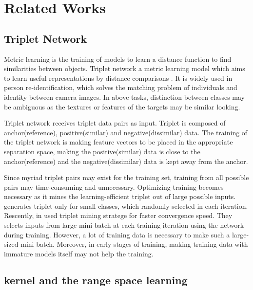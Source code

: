 \documentclass[runningheads]{llncs}
\begin{document}
\section{Related Works}

\subsection{Triplet Network}
Metric learning is the training of models to learn a distance function to find similarities between objects. 
Triplet network a metric learning model which aims to learn useful representations by distance comparisons \cite{hoffer2015deep}. It is widely used in person re-identification, which solves the matching problem of individuals and identity between camera images\cite{ding2015deep,cheng2016person,chen2017beyond,schroff2015facenet,wang2016joint}. In above tasks, distinction between classes may be ambiguous as the textures or features of the targets may be similar looking.

Triplet network receives triplet data pairs as input. Triplet is composed of anchor(reference), positive(similar) and negative(dissimilar) data.
The training of the triplet network is making feature vectors to be placed in the appropriate separation space, making the positive(similar) data is close to the anchor(reference) and the negative(dissimilar) data is kept away from the anchor.

Since myriad triplet pairs may exist for the training set, training from all possible pairs may time-consuming and unnecessary. Optimizing training becomes necessary as it mines the learning-efficient triplet out of large possible inputs.
\cite{cheng2016person,ding2015deep,wang2016joint} generates triplet only for small classes, which randomly selected in each iteration.
Rescently, in \cite{schroff2015facenet} used triplet mining stratege for faster convergence speed. They selects inputs from large mini-batch at each training iteration using the network during training.
However, a lot of training data is necessary to make such a large-sized mini-batch. Moreover, in early stages of training, making training data with immature models itself may not help the training.


\subsection{kernel and the range space learning}\label{kar}
\end{document}
